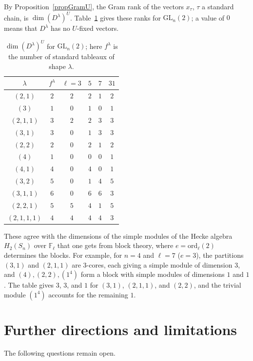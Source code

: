\documentclass[11pt, letterpaper]{amsart}
\theoremstyle{definition}
\theoremstyle{remark}
\newcommand{\FF}{\mathbb{F}}
\newcommand{\GL}{\mathrm{GL}}
\begin{document}
By Proposition~\ref{propGramU}, the Gram rank of the vectors $x_\tau$, $\tau$ a standard chain, is $\dim(D^\lambda)^U$. Table~\ref{tabU} gives these ranks for $\GL_n(2)$; a value of $0$ means that $D^\lambda$ has no $U$-fixed vectors.

\begin{table}[h]
\centering
\caption{$\dim(D^\lambda)^U$ for $\GL_n(2)$; here $f^\lambda$ is the number of standard tableaux of shape $\lambda$.}\label{tabU}
\begin{tabular}{c|c|cccc}
$\lambda$ & $f^\lambda$ & $\ell=3$ & $5$ & $7$ & $31$\\\hline
$(2,1)$ & $2$ & $2$ & $2$ & $1$ & $2$\\
$(3)$ & $1$ & $0$ & $1$ & $0$ & $1$\\
$(2,1,1)$ & $3$ & $2$ & $2$ & $3$ & $3$\\
$(3,1)$ & $3$ & $0$ & $1$ & $3$ & $3$\\
$(2,2)$ & $2$ & $0$ & $2$ & $1$ & $2$\\
$(4)$ & $1$ & $0$ & $0$ & $0$ & $1$\\
$(4,1)$ & $4$ & $0$ & $4$ & $0$ & $1$\\
$(3,2)$ & $5$ & $0$ & $1$ & $4$ & $5$\\
$(3,1,1)$ & $6$ & $0$ & $6$ & $6$ & $3$\\
$(2,2,1)$ & $5$ & $5$ & $4$ & $1$ & $5$\\
$(2,1,1,1)$ & $4$ & $4$ & $4$ & $4$ & $3$\\
\end{tabular}
\end{table}

These agree with the dimensions of the simple modules of the Hecke algebra $H_2(S_n)$ over $\FF_\ell$ that one gets from block theory, where $e=\mathrm{ord}_\ell(2)$ determines the blocks. For example, for $n=4$ and $\ell=7$ ($e=3$), the partitions $(3,1)$ and $(2,1,1)$ are $3$-cores, each giving a simple module of dimension $3$, and $(4),(2,2),(1^4)$ form a block with simple modules of dimensions $1$ and $1$. The table gives $3$, $3$, and $1$ for $(3,1)$, $(2,1,1)$, and $(2,2)$, and the trivial module $(1^4)$ accounts for the remaining $1$.

\section{Further directions and limitations}\label{secfurther}

The following questions remain open.
\end{document}

